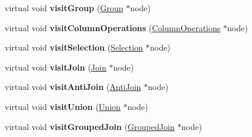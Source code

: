 \begin{DoxyCompactItemize}
\item 
\hypertarget{class_algebra_visitor_af77bf2aaa949ea27cf992053c43a391b}{virtual void {\bfseries visit\+Group} (\hyperlink{class_group}{Group} $\ast$node)}\label{class_algebra_visitor_af77bf2aaa949ea27cf992053c43a391b}

\item 
\hypertarget{class_algebra_visitor_a1109510d982a8e5b90fc56d443109ef9}{virtual void {\bfseries visit\+Column\+Operations} (\hyperlink{class_column_operations}{Column\+Operations} $\ast$node)}\label{class_algebra_visitor_a1109510d982a8e5b90fc56d443109ef9}

\item 
\hypertarget{class_algebra_visitor_a7d9b0618ac2fdd036abdab27cbb83d40}{virtual void {\bfseries visit\+Selection} (\hyperlink{class_selection}{Selection} $\ast$node)}\label{class_algebra_visitor_a7d9b0618ac2fdd036abdab27cbb83d40}

\item 
\hypertarget{class_algebra_visitor_a841875539a07c979b912ef44455b873c}{virtual void {\bfseries visit\+Join} (\hyperlink{class_join}{Join} $\ast$node)}\label{class_algebra_visitor_a841875539a07c979b912ef44455b873c}

\item 
\hypertarget{class_algebra_visitor_add62415db5f188e572cef1c36faa842e}{virtual void {\bfseries visit\+Anti\+Join} (\hyperlink{class_anti_join}{Anti\+Join} $\ast$node)}\label{class_algebra_visitor_add62415db5f188e572cef1c36faa842e}

\item 
\hypertarget{class_algebra_visitor_a681732083691701f0e9c10980392dd3c}{virtual void {\bfseries visit\+Union} (\hyperlink{class_union}{Union} $\ast$node)}\label{class_algebra_visitor_a681732083691701f0e9c10980392dd3c}

\item 
\hypertarget{class_algebra_visitor_ae92c2f0a465dacc4f42a71e879346c94}{virtual void {\bfseries visit\+Grouped\+Join} (\hyperlink{class_grouped_join}{Grouped\+Join} $\ast$node)}\label{class_algebra_visitor_ae92c2f0a465dacc4f42a71e879346c94}

\end{DoxyCompactItemize}
